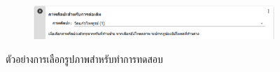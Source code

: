 \begin{figure}[H]
    \centering
    \begin{subfigure}{0.8\linewidth}
        \centering
        \includegraphics[width=1\linewidth]{image/appendix_colab/select_image.png}
    \end{subfigure}
    \caption{ตัวอย่างการเลือกรูปภาพสำหรับทำการทดสอบ}
\end{figure}